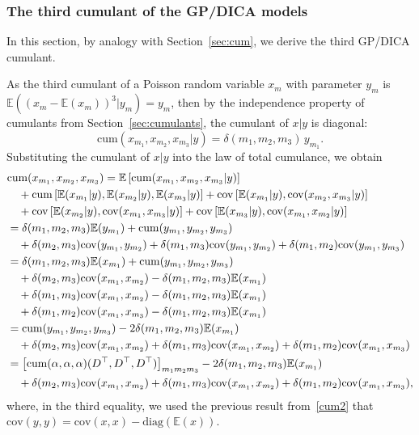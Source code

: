 \documentclass{article}
\newcommand{\sbra}[1]{\left[#1\right]}
\newcommand{\diag}{\mathrm{diag}}
\newcommand{\ga}{\alpha}
\newcommand{\gd}{\delta}
\newcommand{\ebb}{\mathbb{E}}
\newcommand{\cov}{\mathrm{cov}}
\newcommand{\cum}{\mathrm{cum}}
\begin{document}
\subsubsection{The third cumulant of the GP/DICA models} \label{sec:app:3dicacum}
In this section, by analogy with Section~\ref{sec:cum}, we derive the third GP/DICA cumulant.

As the third cumulant of a Poisson random variable $x_m$ with parameter $y_m$ is $\ebb((x_{m}-\ebb(x_{m}))^3|y_{m}) = y_{m}$, then by the independence property of cumulants from Section~\ref{sec:cumulants}, the cumulant of $x|y$ is diagonal:
$$
\cum(x_{m_1},x_{m_2},x_{m_3}|y)=\gd(m_1,m_2,m_3)\, y_{m_1}.
$$
Substituting the cumulant of $x|y$ into the law of total cumulance, we obtain
\begin{align}
&\cum( x_{m_1}, x_{m_2},x_{m_3}) = \ebb\sbra{\cum(x_{m_1},x_{m_2},x_{m_3}|y)} \notag \\
 & \quad+ \cum\sbra{\ebb(x_{m_1}|y),\ebb(x_{m_2}|y),\ebb(x_{m_3}|y)} 
  + \cov\sbra{\ebb( x_{m_1}|y),\cov(x_{m_2},x_{m_3}|y)}  \notag \\
 &\quad + \cov\sbra{\ebb(x_{m_2}|y),\cov(x_{m_1},x_{m_3}|y)} 
  + \cov\sbra{\ebb(x_{m_3}|y),\cov(x_{m_1},x_{m_2}|y)}  \notag \\
 &= \gd(m_1,m_2,m_3) \ebb(y_{m_1}) + \cum(y_{m_1},y_{m_2},y_{m_3})  \notag \\
 &\quad+ \gd(m_2,m_3)\cov(y_{m_1},y_{m_2}) 
 + \gd(m_1,m_3) \cov(y_{m_1},y_{m_2}) 
 + \gd(m_1,m_2) \cov(y_{m_1},y_{m_3})  \notag \\
 &= \gd(m_1,m_2,m_3) \ebb(x_{m_1}) + \cum(y_{m_1},y_{m_2},y_{m_3})  \notag \\
 &\quad + \gd(m_2,m_3) \cov(x_{m_1},x_{m_2}) - \gd(m_1,m_2,m_3) \ebb(x_{m_1})  \notag \\
 &\quad + \gd(m_1,m_3) \cov(x_{m_1},x_{m_2}) - \gd(m_1,m_2,m_3)\ebb(x_{m_1}) \notag \\
 &\quad + \gd(m_1,m_2) \cov(x_{m_1},x_{m_3}) - \gd(m_1,m_2,m_3)\ebb(x_{m_1})  \notag \\
 &= \cum(y_{m_1},y_{m_2},y_{m_3}) - 2\gd(m_1,m_2,m_3)\ebb(x_{m_1})   \notag \\
 &\quad + \gd(m_2,m_3) \cov(x_{m_1},x_{m_2}) 
 + \gd(m_1,m_3) \cov(x_{m_1},x_{m_2}) 
 + \gd(m_1,m_2) \cov(x_{m_1},x_{m_3})  \notag \\
 &= \sbra{\cum(\ga,\ga,\ga)(D^{\top},D^{\top},D^{\top})}_{m_1m_2m_3} - 2\gd(m_1,m_2,m_3) \ebb(x_{m_1})   \notag \\
 &\quad + \gd(m_2,m_3) \cov(x_{m_1},x_{m_2}) 
 + \gd(m_1,m_3) \cov(x_{m_1},x_{m_2}) 
 + \gd(m_1,m_2) \cov(x_{m_1},x_{m_3}),
 \label{cum3}
\end{align}
where, in the third equality, we used the previous result from~\eqref{cum2} that $\cov(y,y) = \cov(x,x) - \diag(\ebb(x))$.
\end{document}
